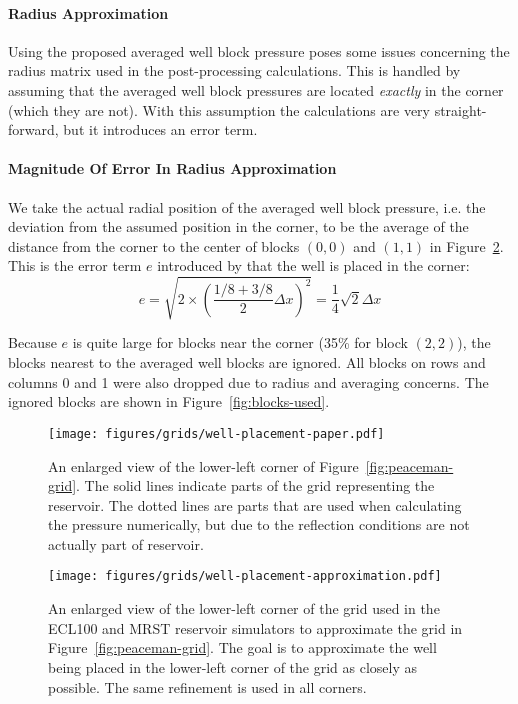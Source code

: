\paragraph{Radius Approximation} %
\label{par:radius_approximation}
Using the proposed averaged well block pressure poses some issues concerning the radius matrix used in the post-processing calculations. This is handled by assuming that the averaged well block pressures are located \emph{exactly} in the corner (which they are not). With this assumption the calculations are very straight-forward, but it introduces an error term. 

\paragraph{Magnitude Of Error In Radius Approximation} %
\label{par:error_in_radius_approximation}
We take the actual radial position of the averaged well block pressure, i.e. the deviation from the assumed position in the corner, to be the average of the distance from the corner to the center of blocks $(0,0)$ and $(1,1)$ in Figure~\ref{fig:well-placement-approximation}. This is the error term $e$ introduced by that the well is placed in the corner:
\begin{equation}
    e = \sqrt{2\times \left( \frac{1/8+3/8}{2}\Delta x \right)^2} = \frac{1}{4}\sqrt{2}\Delta x
\end{equation}

Because $e$ is quite large for blocks near the corner (35\% for block $(2,2)$), the  blocks nearest to the averaged well blocks are ignored. All blocks on rows and columns 0 and 1 were also dropped due to radius and averaging concerns. The ignored blocks are shown in Figure~\ref{fig:blocks-used}.

\begin{figure}[H]
    \centering
    \texttt{[image: figures/grids/well-placement-paper.pdf]}
    \caption{An enlarged view of the lower-left corner of Figure~\ref{fig:peaceman-grid}. The solid lines indicate parts of the grid representing the reservoir. The dotted lines are parts that are used when calculating the pressure numerically, but due to the reflection conditions are not actually part of reservoir.}
    \label{fig:well-placement-paper}
\end{figure}

\begin{figure}[H]
    \centering
    \texttt{[image: figures/grids/well-placement-approximation.pdf]}
    \caption{An enlarged view of the lower-left corner of the grid used in the ECL100 and MRST reservoir simulators to approximate the grid in Figure~\ref{fig:peaceman-grid}. The goal is to approximate the well being placed in the lower-left corner of the grid as closely as possible. The same refinement is used in all corners.}
    \label{fig:well-placement-approximation}
\end{figure}

